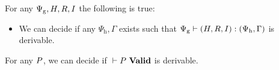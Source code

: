 \begin{lemma}
  For any $\Psi_{\mathrm{g}},H, R, I$ the following is true:

  \begin{itemize}
  \item We can decide if any $\Psi_{\mathrm{h}},\Gamma$ exists such that
    ${\Psi_{\mathrm{g}}} |- {(H, R, I)} : {(\Psi_{\mathrm{h}},\Gamma)}$ is derivable.
  \end{itemize}
\end{lemma}

\begin{lemma}
  For any $P$, we can decide if ${} |- {P}\ \mathbf{Valid}$ is derivable.
\end{lemma}
